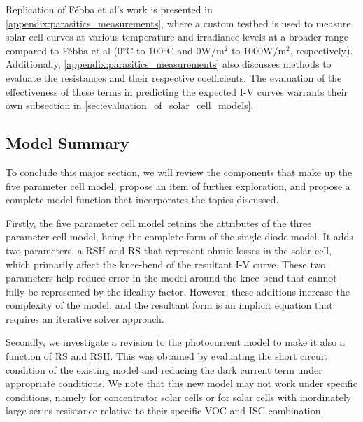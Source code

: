 Replication of Fébba et al's work is presented in
\autoref{appendix:parasitics_measurements}, where a custom testbed is used
to measure solar cell curves at various temperature and irradiance levels at a
broader range compared to Fébba et al ($0\si{\celsius}$ to $100\si{\celsius}$
and $0\si{\watt/\meter^2}$ to $1000\si{\watt/\meter^2}$, respectively).
Additionally, \autoref{appendix:parasitics_measurements} also discusses
methods to evaluate the resistances and their respective coefficients. The
evaluation of the effectiveness of these terms in predicting the expected
\ac{I-V} curves warrants their own subsection in
\autoref{sec:evaluation_of_solar_cell_models}.



\subsection{Model Summary}\label{subsec:five_param_model_summary}

To conclude this major section, we will review the components that make up the
five parameter cell model, propose an item of further exploration, and propose a
complete model function that incorporates the topics discussed.

Firstly, the five parameter cell model retains the attributes of the three
parameter cell model, being the complete form of the single diode model. It adds
two parameters, a \acf{RSH} and \acf{RS} that represent ohmic losses in the
solar cell, which primarily affect the knee-bend of the resultant \ac{I-V}
curve. These two parameters help reduce error in the model around the knee-bend
that cannot fully be represented by the ideality factor. However, these
additions increase the complexity of the model, and the resultant form is an
implicit equation that requires an iterative solver approach.

Secondly, we investigate a revision to the photocurrent model to make it also a
function of \ac{RS} and \ac{RSH}. This was obtained by evaluating the short
circuit condition of the existing model and reducing the dark current term under
appropriate conditions. We note that this new model may not work under specific
conditions, namely for concentrator solar cells or for solar cells with
inordinately large series resistance relative to their specific \ac{VOC} and
\ac{ISC} combination.

